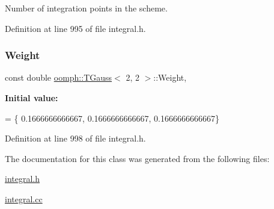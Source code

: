Number of integration points in the scheme. 



Definition at line 995 of file integral.\+h.

\mbox{\label{classoomph_1_1TGauss_3_012_00_012_01_4_a15b24895b6d3e309de659b46d110a21e}} 
\subsubsection{\texorpdfstring{Weight}{Weight}}
{\footnotesize\ttfamily const double \hyperlink{classoomph_1_1TGauss}{oomph\+::\+T\+Gauss}$<$ 2, 2 $>$\+::Weight\hspace{0.3cm}{\ttfamily [static]}, {\ttfamily [private]}}

{\bfseries Initial value\+:}
\begin{DoxyCode}
= \{
0.1666666666667,
0.1666666666667,
0.1666666666667\}
\end{DoxyCode}


Definition at line 998 of file integral.\+h.



The documentation for this class was generated from the following files\+:\begin{DoxyCompactItemize}
\item 
\hyperlink{integral_8h}{integral.\+h}\item 
\hyperlink{integral_8cc}{integral.\+cc}\end{DoxyCompactItemize}
